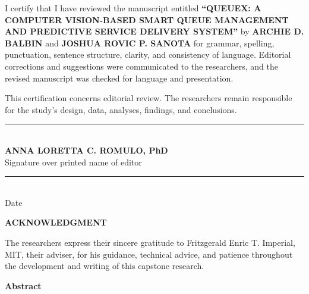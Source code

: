 \documentclass{research}
\begin{document}
\noindent I certify that I have reviewed the manuscript entitled
\textbf{``QUEUEX: A COMPUTER VISION-BASED SMART QUEUE MANAGEMENT AND
PREDICTIVE SERVICE DELIVERY SYSTEM''} by \textbf{ARCHIE D. BALBIN} and
\textbf{JOSHUA ROVIC P. SANOTA} for grammar, spelling, punctuation,
sentence structure, clarity, and consistency of language. Editorial
corrections and suggestions were communicated to the researchers, and
the revised manuscript was checked for language and presentation.

\noindent This certification concerns editorial review. The
researchers remain responsible for the study's design, data, analyses,
findings, and conclusions.

\vspace{3em}
\begin{center}
\rule{0.58\textwidth}{0.4pt}\\
\textbf{ANNA LORETTA C. ROMULO, PhD}\\
Signature over printed name of editor\\[1em]
\rule{0.38\textwidth}{0.4pt}\\
Date
\end{center}

\newpage

\begin{center}
\textbf{ACKNOWLEDGMENT}
\end{center}
\vspace{1.5em}

\noindent The researchers express their sincere gratitude to
Fritzgerald Enric T. Imperial, MIT, their adviser, for his guidance,
technical advice, and patience throughout the development and writing
of this capstone research.

\newpage

\begin{center}
{\large\textbf{Abstract}}
\end{center}
\vspace{0.8em}
\end{document}
